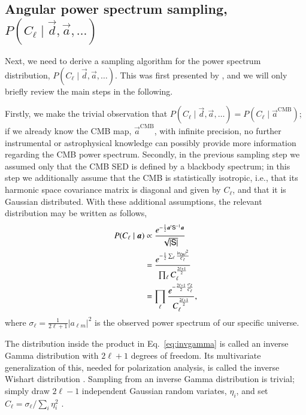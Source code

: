 \documentclass[twocolumn]{aa}
\renewcommand{\d}[0]{\vec{d}}
\renewcommand{\a}[0]{\vec{a}}
\renewcommand{\S}[0]{\tens{S}}
\begin{document}
\subsection{Angular power spectrum sampling, $P(C_{\ell}\mid\d, \a, \ldots)$}
\label{sec:cl_sampling}

Next, we need to derive a sampling algorithm for the power spectrum
distribution, $P(C_{\ell}\mid\d, \a, \ldots)$. This was first
presented by \citet{wandelt2004}, and we will only briefly review the
main steps in the following.

Firstly, we make the trivial observation that ${P(C_{\ell}\mid\d, \a,
\ldots) = P(C_{\ell}\mid\a^{\mathrm{CMB}})}$; if we already know the
CMB map, $\a^{\mathrm{CMB}}$, with infinite precision, no further
instrumental or astrophysical knowledge can possibly provide more
information regarding the CMB power spectrum. Secondly, in the
previous sampling step we assumed only that the CMB SED is defined by
a blackbody spectrum; in this step we additionally assume that the CMB
is statistically isotropic, i.e., that its harmonic space covariance
matrix is diagonal and given by $C_{\ell}$, and that it is Gaussian
distributed. With these additional assumptions, the relevant
distribution may be written as follows,
\begin{align}
  P(C_{\ell}\mid\a) &\propto
  \frac{e^{-\frac{1}{2}\a^t\S^{-1}\a}}{\sqrt{|\S|}}\\
  &=\frac{e^{-\frac{1}{2}\sum_{\ell} \frac{|a_{\ell
          m}|^2}{C_{\ell}}}}{\prod_{\ell}
    C_{\ell}^{\frac{2\ell+1}{2}}}\\
&= \prod_{\ell}
  \frac{e^{-\frac{2\ell+1}{2}\frac{\sigma_{\ell}}{C_{\ell}}}}{C_{\ell}^{\frac{2\ell+1}{2}}},
  \label{eq:invgamma}
\end{align}
where $\sigma_{\ell} = \frac{1}{2\ell+1}|a_{\ell m}|^2$ is the
observed power spectrum of our specific universe.

The distribution inside the product in Eq.~\eqref{eq:invgamma} is
called an inverse Gamma distribution with $2\ell+1$ degrees of
freedom. Its multivariate generalization of this, needed for
polarization analysis, is called the inverse Wishart distribution
\citep{larson:2006}. Sampling from an inverse Gamma distribution is
trivial; simply draw $2\ell-1$ independent Gaussian random variates,
$\eta_i$, and set $C_{\ell} = \sigma_{\ell}/\sum_{i}\eta_{i}^2$
\citep{wandelt2004}.
\end{document}

